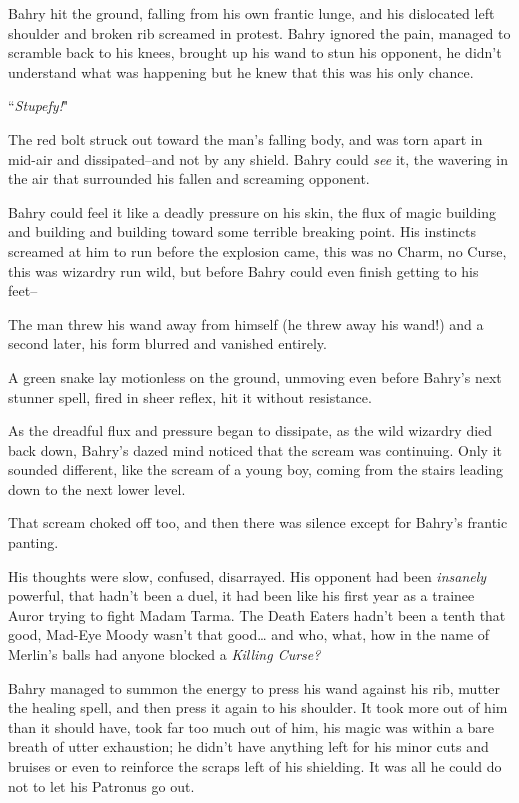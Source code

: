 Bahry hit the ground, falling from his own frantic lunge, and his dislocated left shoulder and broken rib screamed in protest. Bahry ignored the pain, managed to scramble back to his knees, brought up his wand to stun his opponent, he didn't understand what was happening but he knew that this was his only chance.

``\emph{Stupefy!}"

The red bolt struck out toward the man's falling body, and was torn apart in mid-air and dissipated\---and not by any shield. Bahry could \emph{see} it, the wavering in the air that surrounded his fallen and screaming opponent.

Bahry could feel it like a deadly pressure on his skin, the flux of magic building and building and building toward some terrible breaking point. His instincts screamed at him to run before the explosion came, this was no Charm, no Curse, this was wizardry run wild, but before Bahry could even finish getting to his feet\---

The man threw his wand away from himself (he threw away his wand!) and a second later, his form blurred and vanished entirely.

A green snake lay motionless on the ground, unmoving even before Bahry's next stunner spell, fired in sheer reflex, hit it without resistance.

As the dreadful flux and pressure began to dissipate, as the wild wizardry died back down, Bahry's dazed mind noticed that the scream was continuing. Only it sounded different, like the scream of a young boy, coming from the stairs leading down to the next lower level.

That scream choked off too, and then there was silence except for Bahry's frantic panting.

His thoughts were slow, confused, disarrayed. His opponent had been \emph{insanely} powerful, that hadn't been a duel, it had been like his first year as a trainee Auror trying to fight Madam Tarma. The Death Eaters hadn't been a tenth that good, Mad-Eye Moody wasn't that good{\ldots} and who, what, how in the name of Merlin's balls had anyone blocked a \emph{Killing Curse?}

Bahry managed to summon the energy to press his wand against his rib, mutter the healing spell, and then press it again to his shoulder. It took more out of him than it should have, took far too much out of him, his magic was within a bare breath of utter exhaustion; he didn't have anything left for his minor cuts and bruises or even to reinforce the scraps left of his shielding. It was all he could do not to let his Patronus go out.

